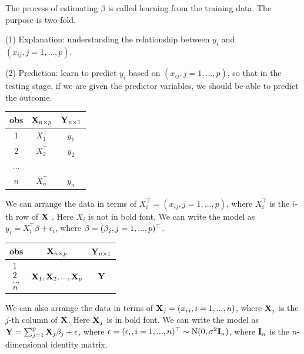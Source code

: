 \documentclass{article}\usepackage[]{graphicx}\usepackage[]{color}
\def\T{{\top}}
\def\X{{\bf X}}
\def\Y{{\bf Y}}
\def\I{{\bf I}}
\def\bbeta{\boldmath{\beta}}
\begin{document}
The process of estimating $\beta$ is called learning from the training data. The purpose is two-fold. 

(1) Explanation: understanding the relationship between $y_i$ and $(x_{ij}, j = 1, ..., p)$. 

(2) Prediction: learn to predict $y_i$ based on $(x_{ij}, j = 1, ..., p)$, so that in the testing stage, if we are given the predictor variables, we should be able to predict the outcome. 


\begin{table}[h]
\centering
\begin{tabular}{|c|c|c|}
\hline
 obs & $\X_{n\times p}$ & $\Y_{n\times 1}$ \\
\hline\hline
 1   & $X_1^\T$         & $y_1$ \\
 2   & $X_2^\T$         & $y_2$ \\
...  &                 &\\
$n$  &  $X_n^\T$        & $y_n$ \\
\hline
\end{tabular}
\end{table}

We can arrange the data in terms of $X_i^\T = (x_{ij}, j = 1, ..., p)$, where $X_i^\T$ is the $i$-th row of $\X$ . Here $X_i$ is not in bold font.  We can write the model as $y_i = X_i^\T \beta + \epsilon_i$, where $\bbeta = (\beta_{j}, j = 1, ..., p)^\T$.

\begin{table}[h]
\centering
\begin{tabular}{|c|c|c|}
\hline
 obs & $\X_{n\times p}$ & $\Y_{n\times 1}$ \\
\hline\hline
$\begin{matrix} 1\\ 2\\...\\ n \end{matrix}$  & $\X_1, \X_2, ..., \X_p$         & $\Y$ \\
\hline
\end{tabular}
\end{table}

We can also arrange the data in terms of $\X_j = (x_{ij}, i = 1, ..., n)$, where $\X_j$ is the $j$-th column of $\X$. Here $\X_j$ is in bold font.  We can write the model as $\Y = \sum_{j=1}^{p} \X_j \beta_j + \epsilon$, where $\epsilon = (\epsilon_i, i = 1, ..., n)^\T \sim {\rm N} (0, \sigma^2 \I_n)$, where $\I_n$ is the $n$-dimensional identity matrix. 
\end{document}
